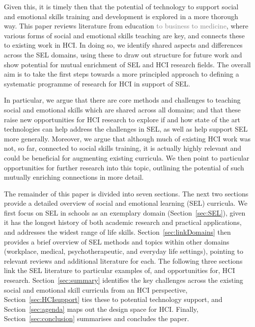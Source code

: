 \documentclass[prodmode,acmtochi]{acmsmall}
\newcommand{\rephrase}[1]{\textrm{\textrm{\textcolor{gray}{#1}}}}
\begin{document}
Given this, it is timely then that the potential of technology to support social and emotional skills training and development is explored in a more thorough way.
This paper reviews literature from education  \rephrase{to business to medicine}, where various forms of social and emotional skills teaching are key, and connects these to existing work in HCI. 
%
In doing so, we identify shared aspects and differences across the SEL domains, using these to draw out structure for future work and show potential for mutual enrichment of SEL and HCI research fields. 
%
The overall aim is to take the first steps towards a more principled approach
to defining a systematic programme of research for HCI in support of SEL. 

In particular, we argue that there are core methods and challenges to teaching social and emotional skills which are shared across all domains; and that these raise new opportunities for HCI research to explore if and how state of the art technologies can help address the challenges in SEL, as well as help support SEL more generally.
%
%
Moreover, we argue that although much of existing HCI work was not, so far, connected to social skills training, it is actually highly relevant and could be beneficial for augmenting existing curricula.
%
We then point to particular opportunities for further research into this topic, outlining the potential of such mutually enriching connections in more detail. 


The remainder of this paper is divided into seven sections. The next two sections provide a detailed overview of social and emotional learning (SEL) curricula.  We first focus on SEL in schools  as an exemplary domain (Section~\ref{sec:SEL}), given it has the longest history of both academic research and practical applications, and addresses  the widest range of life skills. Section~\ref{sec:linkDomains} then provides a brief overview of SEL methods and topics within other domains  (workplace, medical, psychotherapeutic, and everyday life settings), pointing to relevant reviews and additional literature for each. The following three sections link the SEL literature to particular examples of, and opportunities for, HCI research. Section~\ref{sec:summary} identifies the key challenges across the existing social and emotional skill curricula from an HCI perspective, Section~\ref{sec:HCIsupport} ties these to potential technology support, and Section~\ref{sec:agenda} maps out the design space for HCI. Finally, Section~\ref{sec:conclusion} summarises and concludes the paper.
        
\end{document}
